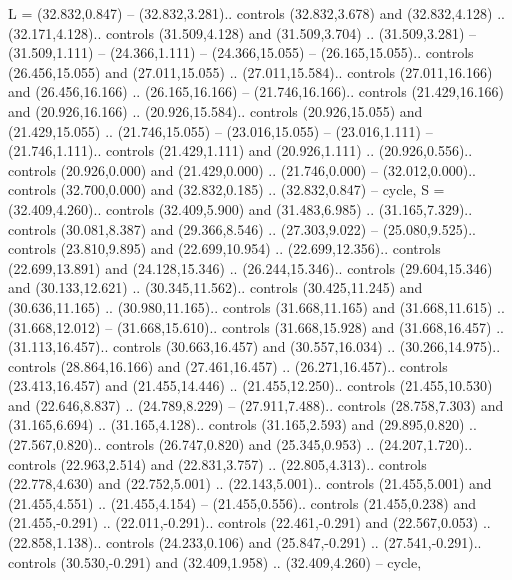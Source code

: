 {L} = {(32.832,0.847) -- (32.832,3.281).. controls (32.832,3.678) and (32.832,4.128) .. (32.171,4.128).. controls (31.509,4.128) and (31.509,3.704) .. (31.509,3.281) -- (31.509,1.111) -- (24.366,1.111) -- (24.366,15.055) -- (26.165,15.055).. controls (26.456,15.055) and (27.011,15.055) .. (27.011,15.584).. controls (27.011,16.166) and (26.456,16.166) .. (26.165,16.166) -- (21.746,16.166).. controls (21.429,16.166) and (20.926,16.166) .. (20.926,15.584).. controls (20.926,15.055) and (21.429,15.055) .. (21.746,15.055) -- (23.016,15.055) -- (23.016,1.111) -- (21.746,1.111).. controls (21.429,1.111) and (20.926,1.111) .. (20.926,0.556).. controls (20.926,0.000) and (21.429,0.000) .. (21.746,0.000) -- (32.012,0.000).. controls (32.700,0.000) and (32.832,0.185) .. (32.832,0.847) -- cycle},
{S} = {(32.409,4.260).. controls (32.409,5.900) and (31.483,6.985) .. (31.165,7.329).. controls (30.081,8.387) and (29.366,8.546) .. (27.303,9.022) -- (25.080,9.525).. controls (23.810,9.895) and (22.699,10.954) .. (22.699,12.356).. controls (22.699,13.891) and (24.128,15.346) .. (26.244,15.346).. controls (29.604,15.346) and (30.133,12.621) .. (30.345,11.562).. controls (30.425,11.245) and (30.636,11.165) .. (30.980,11.165).. controls (31.668,11.165) and (31.668,11.615) .. (31.668,12.012) -- (31.668,15.610).. controls (31.668,15.928) and (31.668,16.457) .. (31.113,16.457).. controls (30.663,16.457) and (30.557,16.034) .. (30.266,14.975).. controls (28.864,16.166) and (27.461,16.457) .. (26.271,16.457).. controls (23.413,16.457) and (21.455,14.446) .. (21.455,12.250).. controls (21.455,10.530) and (22.646,8.837) .. (24.789,8.229) -- (27.911,7.488).. controls (28.758,7.303) and (31.165,6.694) .. (31.165,4.128).. controls (31.165,2.593) and (29.895,0.820) .. (27.567,0.820).. controls (26.747,0.820) and (25.345,0.953) .. (24.207,1.720).. controls (22.963,2.514) and (22.831,3.757) .. (22.805,4.313).. controls (22.778,4.630) and (22.752,5.001) .. (22.143,5.001).. controls (21.455,5.001) and (21.455,4.551) .. (21.455,4.154) -- (21.455,0.556).. controls (21.455,0.238) and (21.455,-0.291) .. (22.011,-0.291).. controls (22.461,-0.291) and (22.567,0.053) .. (22.858,1.138).. controls (24.233,0.106) and (25.847,-0.291) .. (27.541,-0.291).. controls (30.530,-0.291) and (32.409,1.958) .. (32.409,4.260) -- cycle},

